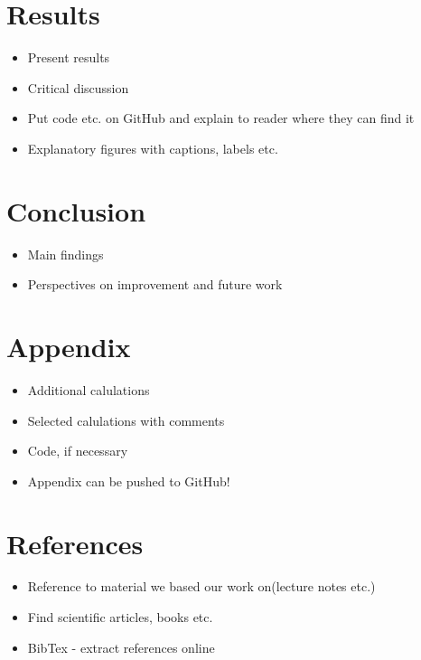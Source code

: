 \documentclass[12pt]{article}
\begin{document}
\section{Results}

\begin{itemize}
\item Present results
\item Critical discussion
\item Put code etc. on GitHub and explain to reader where they can find it
\item Explanatory figures with captions, labels etc.
\end{itemize}

\section{Conclusion}

\begin{itemize}
\item Main findings
\item Perspectives on improvement and future work
\end{itemize}

\section{Appendix}

\begin{itemize}
\item Additional calulations
\item Selected calulations with comments
\item Code, if necessary
\item Appendix can be pushed to GitHub!
\end{itemize}

\section{References}

\begin{itemize}
\item Reference to material we based our work on(lecture notes etc.)
\item Find scientific articles, books etc.
\item BibTex - extract references online
\end{itemize}
\end{document}
